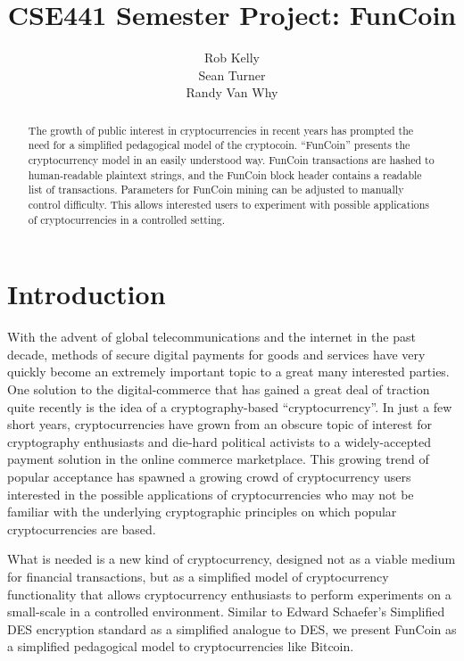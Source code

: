 \documentclass[12pt]{article}
\begin{document}
\title{CSE441 Semester Project: FunCoin}
\author{Rob Kelly\\Sean Turner\\Randy Van Why}
\maketitle

\begin{abstract}
  The growth of public interest in cryptocurrencies in recent years has prompted the need for a simplified pedagogical model of the cryptocoin. ``FunCoin'' presents the cryptocurrency model in an easily understood way. FunCoin transactions are hashed to human-readable plaintext strings, and the FunCoin block header contains a readable list of transactions. Parameters for FunCoin mining can be adjusted to manually control difficulty. This allows interested users to experiment with possible applications of cryptocurrencies in a controlled setting.
\end{abstract}

\section{Introduction}
With the advent of global telecommunications and the internet in the past decade, methods of secure digital payments for goods and services have very quickly become an extremely important topic to a great many interested parties. One solution to the digital-commerce that has gained a great deal of traction quite recently is the idea of a cryptography-based ``cryptocurrency''. In just a few short years, cryptocurrencies have grown from an obscure topic of interest for cryptography enthusiasts and die-hard political activists to a widely-accepted payment solution in the online commerce marketplace. This growing trend of popular acceptance has spawned a growing crowd of cryptocurrency users interested in the possible applications of cryptocurrencies who may not be familiar with the underlying cryptographic principles on which popular cryptocurrencies are based.

What is needed is a new kind of cryptocurrency, designed not as a viable medium for financial transactions, but as a simplified model of cryptocurrency functionality that allows cryptocurrency enthusiasts to perform experiments on a small-scale in a controlled environment. Similar to Edward Schaefer's Simplified DES\cite{schaefer:sdes} encryption standard as a simplified analogue to DES, we present FunCoin as a simplified pedagogical model to cryptocurrencies like Bitcoin.
\end{document}
